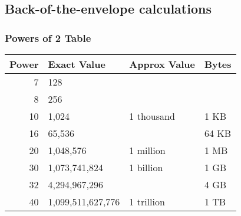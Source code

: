 \subsection{Back-of-the-envelope calculations}
\subsubsection{Powers of 2 Table}
\begin{summary}
    \begin{center}
        \begin{tabular}{r l l l}
        \toprule
        \textbf{Power} & \textbf{Exact Value} & \textbf{Approx Value} & \textbf{Bytes} \\
        \midrule
        7  & 128 & & \\
        8  & 256 & & \\
        10 & 1,024 & 1 thousand & 1 KB \\
        16 & 65,536 & & 64 KB \\
        20 & 1,048,576 & 1 million & 1 MB \\
        30 & 1,073,741,824 & 1 billion & 1 GB \\
        32 & 4,294,967,296 & & 4 GB \\
        40 & 1,099,511,627,776 & 1 trillion & 1 TB \\
        \bottomrule
        \end{tabular}
    \end{center}
\end{summary}

